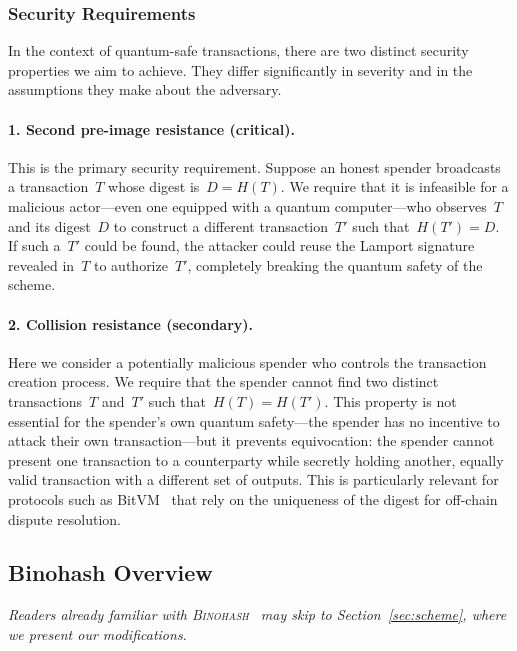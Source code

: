 \documentclass[11pt, a4paper]{article}
\begin{document}
\subsubsection{Security Requirements}

In the context of quantum-safe transactions, there are two distinct security properties we aim to achieve. They differ significantly in severity and in the assumptions they make about the adversary.

\paragraph{1. Second pre-image resistance (critical).}
This is the primary security requirement. Suppose an honest spender broadcasts a transaction~$T$ whose digest is~$D = H(T)$. We require that it is infeasible for a malicious actor---even one equipped with a quantum computer---who observes~$T$ and its digest~$D$ to construct a different transaction~$T'$ such that~$H(T') = D$. If such a~$T'$ could be found, the attacker could reuse the Lamport signature revealed in~$T$ to authorize~$T'$, completely breaking the quantum safety of the scheme.

\paragraph{2. Collision resistance (secondary).}
Here we consider a potentially malicious spender who controls the transaction creation process. We require that the spender cannot find two distinct transactions~$T$ and~$T'$ such that~$H(T) = H(T')$. This property is not essential for the spender's own quantum safety---the spender has no incentive to attack their own transaction---but it prevents equivocation: the spender cannot present one transaction to a counterparty while secretly holding another, equally valid transaction with a different set of outputs. This is particularly relevant for protocols such as BitVM~\cite{linus2024binohash} that rely on the uniqueness of the digest for off-chain dispute resolution.

\subsection{Binohash Overview}
\label{sec:binohash-overview}

\noindent\textit{Readers already familiar with \textsc{Binohash}~\cite{linus2024binohash} may skip to Section~\ref{sec:scheme}, where we present our modifications.}
\end{document}
